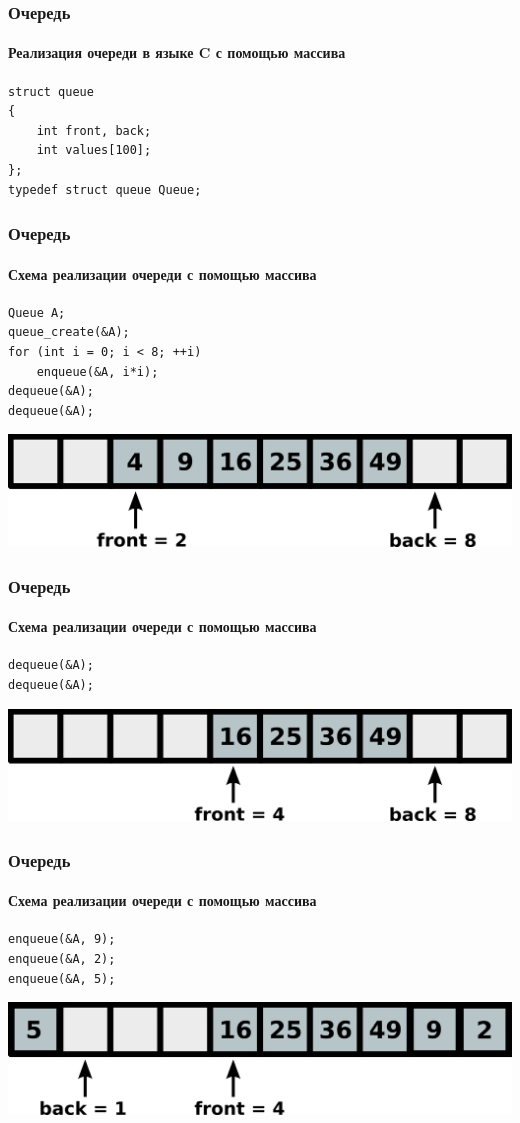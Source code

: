 \documentclass[12pt,pdf,hyperref={unicode}]{beamer}
\begin{document}
\begin{frame}[fragile]
\frametitle{Очередь} 
\framesubtitle{Реализация очереди в языке C с помощью массива} 
\begin{lstlisting}
struct queue 
{
    int front, back;
    int values[100];
};
typedef struct queue Queue;
\end{lstlisting}
\end{frame}

\begin{frame}[fragile]
\frametitle{Очередь} 
\framesubtitle{Схема реализации очереди с помощью массива} 
\begin{lstlisting}
Queue A;
queue_create(&A);
for (int i = 0; i < 8; ++i)
    enqueue(&A, i*i);
dequeue(&A);
dequeue(&A);
\end{lstlisting}
\begin{center}
\includegraphics[width=0.8\linewidth]{images/queue1.png}
\end{center}
\end{frame}

\begin{frame}[fragile]
\frametitle{Очередь} 
\framesubtitle{Схема реализации очереди с помощью массива} 
\begin{lstlisting}
dequeue(&A);
dequeue(&A);
\end{lstlisting}
\begin{center}
\includegraphics[width=0.8\linewidth]{images/queue2.png}
\end{center}
\end{frame}

\begin{frame}[fragile]
\frametitle{Очередь} 
\framesubtitle{Схема реализации очереди с помощью массива} 
\begin{lstlisting}
enqueue(&A, 9);
enqueue(&A, 2);
enqueue(&A, 5);
\end{lstlisting}
\begin{center}
\includegraphics[width=0.8\linewidth]{images/queue3.png}
\end{center}
\end{frame}
\end{document}

